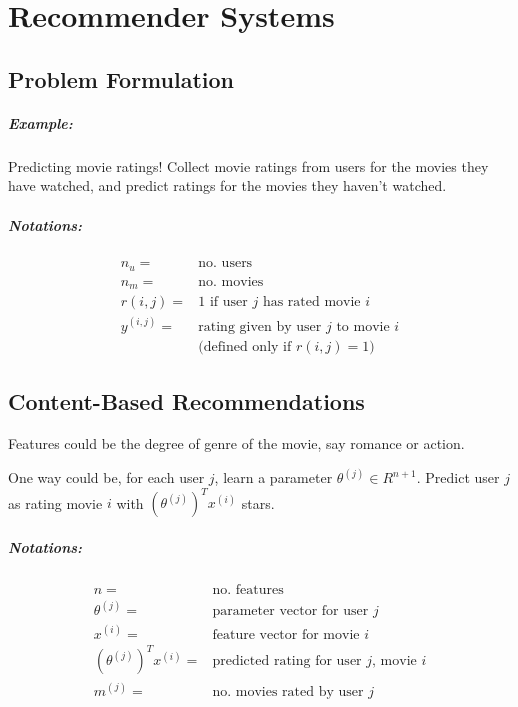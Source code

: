 \chapter{Recommender Systems}
\section{Problem Formulation}
\paragraph{Example:} Predicting movie ratings! Collect movie ratings from users
for the movies they have watched, and predict ratings for the movies they haven't
watched.
\paragraph{Notations:}
\begin{align*}
	n_u ={}       & \text{no. users}                             \\
	n_m ={}       & \text{no. movies}                            \\
	r(i, j) ={}   & \text{$1$ if user $j$ has rated movie $i$}   \\
	y^{(i,j)} ={} & \text{rating given by user $j$ to movie $i$} \\
	              & \text{(defined only if $r(i, j) = 1$)}
\end{align*}

\section{Content-Based Recommendations}
Features could be the degree of genre of the movie, say romance or action.

One way could be, for each user $j$, learn a parameter $\theta^{(j)} \in R^{n+1}$.
Predict user $j$ as rating movie $i$ with $(\theta^{(j)})^Tx^{(i)}$ stars.

\paragraph{Notations:}
\begin{align*}
	n ={}                       & \text{no. features}                             \\
	\theta^{(j)} ={}            & \text{parameter vector for user $j$}            \\
	x^{(i)} ={}                 & \text{feature vector for movie $i$}             \\
	(\theta^{(j)})^Tx^{(i)} ={} & \text{predicted rating for user $j$, movie $i$} \\
	m^{(j)} ={}                 & \text{no. movies rated by user $j$}
\end{align*}

